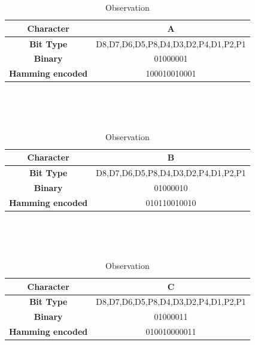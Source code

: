 \documentclass{article}
\numberwithin{equation}{section}
\numberwithin{figure}{section}
\numberwithin{table}{section}
\begin{document}
\begin{table}[h!]
        \centering
        \caption{Observation}\
        
        \
        \begin{tabular}{|c|c|}
            \hline
            \textbf{Character} & A \\
            \hline
            \textbf{Bit Type} & D8,D7,D6,D5,P8,D4,D3,D2,P4,D1,P2,P1 \\
            \hline
            \textbf{Binary} &  01000001 \\
            \hline
            \textbf{Hamming encoded} &  100010010001 \\
            \hline
            
        \end{tabular}
        
\end{table}

\begin{table}[h!]
        \centering
        \caption{Observation}\
       
        \
        \begin{tabular}{|c|c|}
            \hline
            \textbf{Character} & B \\
            \hline
            \textbf{Bit Type} & D8,D7,D6,D5,P8,D4,D3,D2,P4,D1,P2,P1 \\
            \hline
            \textbf{Binary} &   01000010 \\
            \hline
            \textbf{Hamming encoded} &  010110010010 \\
            \hline
            
        \end{tabular}
        
\end{table}


\begin{table}[h!]
        \centering
        \caption{Observation}\

        \
        \begin{tabular}{|c|c|}
            \hline
            \textbf{Character} & C \\
            \hline
            \textbf{Bit Type} & D8,D7,D6,D5,P8,D4,D3,D2,P4,D1,P2,P1 \\
            \hline
            \textbf{Binary} &  01000011 \\
            \hline
            \textbf{Hamming encoded} &  010010000011 \\
            \hline
            
        \end{tabular}
        
        
\end{table}
\end{document}
